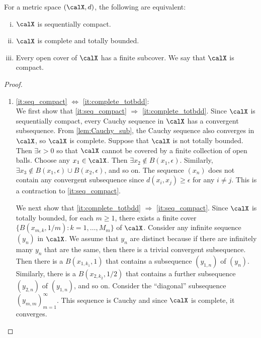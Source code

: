 \documentclass[../aipt.tex]{subfiles}
\begin{document}
\begin{Theorem}\label{wk1:thm:compact}
For a metric space $(\calX, d)$, the following are equivalent:
\begin{enumerate}[(i)]
\item\label{it:seq_compact} $\calX$ is sequentially compact.
\item\label{it:complete_totbdd} $\calX$ is complete and totally bounded.
\item\label{it:compact} Every open cover of $\calX$ has a finite subcover. We say that $\calX$ is compact.
\end{enumerate}
\end{Theorem}
\begin{proof}\
\begin{enumerate}[1)]
\item \ref{it:seq_compact} $\Leftrightarrow$ \ref{it:complete_totbdd}:\\
We first show that \ref{it:seq_compact} $\Rightarrow$ \ref{it:complete_totbdd}. Since $\calX$ is sequentially compact, every Cauchy sequence in $\calX$ has a convergent subsequence. From \cref{lem:Cauchy_sub}, the Cauchy sequence also converges in $\calX$, so $\calX$ is complete. Suppose that $\calX$ is not totally bounded. Then $\exists \epsilon >0$ so that $\calX$ cannot be covered by a finite collection of open balls. Choose any $x_1\in\calX$. Then $\exists x_2\notin B(x_1,\epsilon)$. Similarly, $\exists x_3\notin B(x_1,\epsilon)\cup B(x_2,\epsilon)$, and so on. The sequence $(x_n)$ does not contain any convergent subsequence since $d(x_i,x_j)\geq\epsilon$ for any $i\ne j$. This is a contraction to \ref{it:seq_compact}.

We next show that \ref{it:complete_totbdd} $\Rightarrow$ \ref{it:seq_compact}. Since $\calX$ is totally bounded, for each $m\geq 1$, there exists a finite cover $\{B(x_{m,k}, 1/m): k=1,\ldots,M_m\}$ of $\calX$. Consider any infinite sequence $(y_n)$ in $\calX$. We assume that $y_n$ are distinct because if there are infinitely many $y_n$ that are the same, then there is a trivial convergent subsequence. Then there is a $B(x_{1,k_1},1)$ that contains a subsequence $(y_{1,n})$ of $(y_n)$. Similarly, there is a $B(x_{2,k_2},1/2)$ that contains a further subsequence $(y_{2,n})$ of $(y_{1,n})$, and so on. Consider the ``diagonal'' subsequence $(y_{m,m})_{m=1}^\infty$. This sequence is Cauchy and since $\calX$ is complete, it converges.



\end{enumerate}
\end{proof}
\end{document}
